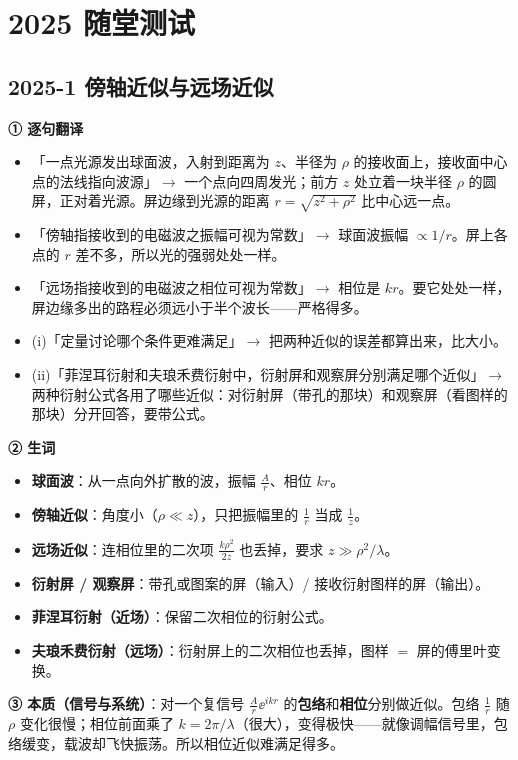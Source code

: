 \section{2025 随堂测试}\label{sec:ex2025}

\subsection{2025-1 傍轴近似与远场近似}\label{ex:2025-1}
\label{rd:2025-1}
\begin{idea}[读题：这道题在说什么]
\textbf{① 逐句翻译}
\begin{itemize}
\item 「一点光源发出球面波，入射到距离为 $z$、半径为 $\rho$ 的接收面上，接收面中心点的法线指向波源」$\to$ 一个点向四周发光；前方 $z$ 处立着一块半径 $\rho$ 的圆屏，正对着光源。屏边缘到光源的距离 $r=\sqrt{z^2+\rho^2}$ 比中心远一点。
\item 「傍轴指接收到的电磁波之振幅可视为常数」$\to$ 球面波振幅 $\propto1/r$。屏上各点的 $r$ 差不多，所以光的强弱处处一样。
\item 「远场指接收到的电磁波之相位可视为常数」$\to$ 相位是 $kr$。要它处处一样，屏边缘多出的路程必须远小于半个波长——严格得多。
\item (i)「定量讨论哪个条件更难满足」$\to$ 把两种近似的误差都算出来，比大小。
\item (ii)「菲涅耳衍射和夫琅禾费衍射中，衍射屏和观察屏分别满足哪个近似」$\to$ 两种衍射公式各用了哪些近似：对衍射屏（带孔的那块）和观察屏（看图样的那块）分开回答，要带公式。
\end{itemize}
\textbf{② 生词}
\begin{itemize}
\item \textbf{球面波}：从一点向外扩散的波，振幅 $\frac{A}{r}$、相位 $kr$。
\item \textbf{傍轴近似}：角度小（$\rho\ll z$），只把振幅里的 $\frac1r$ 当成 $\frac1z$。
\item \textbf{远场近似}：连相位里的二次项 $\frac{k\rho^2}{2z}$ 也丢掉，要求 $z\gg\rho^2/\lambda$。
\item \textbf{衍射屏 / 观察屏}：带孔或图案的屏（输入）/ 接收衍射图样的屏（输出）。
\item \textbf{菲涅耳衍射（近场）}：保留二次相位的衍射公式。
\item \textbf{夫琅禾费衍射（远场）}：衍射屏上的二次相位也丢掉，图样 $=$ 屏的傅里叶变换。
\end{itemize}
\textbf{③ 本质（信号与系统）}：对一个复信号 $\frac{A}{r}\ee^{ikr}$ 的\textbf{包络}和\textbf{相位}分别做近似。包络 $\frac1r$ 随 $\rho$ 变化很慢；相位前面乘了 $k=2\pi/\lambda$（很大），变得极快——就像调幅信号里，包络缓变，载波却飞快振荡。所以相位近似难满足得多。


\end{idea}
